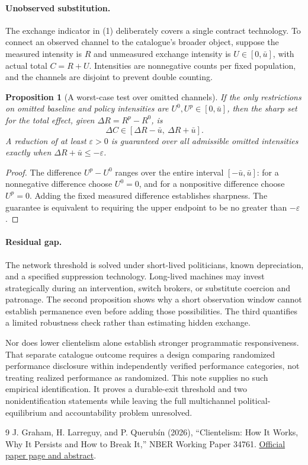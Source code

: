 \documentclass[11pt]{article}
\newtheorem{proposition}[theorem]{Proposition}
\theoremstyle{definition}
\begin{document}
\paragraph{Unobserved substitution.}
The exchange indicator in (1) deliberately covers a single contract technology. To connect an observed channel to the catalogue's broader object, suppose the measured intensity is $R$ and unmeasured exchange intensity is $U\in[0,\bar u]$, with actual total $C=R+U$. Intensities are nonnegative counts per fixed population, and the channels are disjoint to prevent double counting.

\begin{proposition}[A worst-case test over omitted channels]
If the only restrictions on omitted baseline and policy intensities are $U^0,U^p\in[0,\bar u]$, then the sharp set for the total effect, given $\Delta R=R^p-R^0$, is
\[
 \Delta C\in[\Delta R-\bar u,\ \Delta R+\bar u].
\]
A reduction of at least $\varepsilon>0$ is guaranteed over all admissible omitted intensities exactly when $\Delta R+\bar u\leq-\varepsilon$.
\end{proposition}
\begin{proof}
The difference $U^p-U^0$ ranges over the entire interval $[-\bar u,\bar u]$: for a nonnegative difference choose $U^0=0$, and for a nonpositive difference choose $U^p=0$. Adding the fixed measured difference establishes sharpness. The guarantee is equivalent to requiring the upper endpoint to be no greater than $-\varepsilon$.
\end{proof}

\paragraph{Residual gap.}
The network threshold is solved under short-lived politicians, known depreciation, and a specified suppression technology. Long-lived machines may invest strategically during an intervention, switch brokers, or substitute coercion and patronage. The second proposition shows why a short observation window cannot establish permanence even before adding those possibilities. The third quantifies a limited robustness check rather than estimating hidden exchange.

Nor does lower clientelism alone establish stronger programmatic responsiveness. That separate catalogue outcome requires a design comparing randomized performance disclosure within independently verified performance categories, not treating realized performance as randomized. This note supplies no such empirical identification. It proves a durable-exit threshold and two nonidentification statements while leaving the full multichannel political-equilibrium and accountability problem unresolved.

\begin{thebibliography}{9}
 J. Graham, H. Larreguy, and P. Querub\'in (2026), ``Clientelism: How It Works, Why It Persists and How to Break It,'' NBER Working Paper 34761. \href{https://www.nber.org/papers/w34761}{Official paper page and abstract}.
\end{thebibliography}
\end{document}
